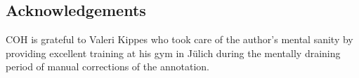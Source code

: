 \documentclass[10pt,a4paper,onecolumn]{article}
\begin{document}
\subsection*{Acknowledgements}
COH is grateful to Valeri Kippes who took care of the author's mental sanity by providing excellent training at his gym in Jülich during the mentally draining period of manual corrections of the annotation.

{\small
}
\end{document}
